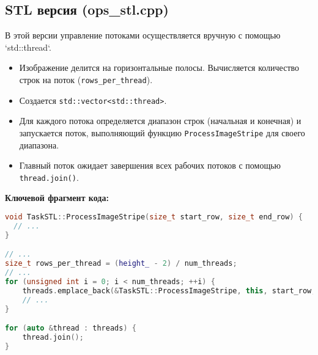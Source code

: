 \documentclass[12pt,a4paper]{extarticle}
\begin{document}
\subsection{STL версия (ops\_stl.cpp)}
В этой версии управление потоками осуществляется вручную с помощью `std::thread`.
\begin{itemize}
    \item Изображение делится на горизонтальные полосы. Вычисляется количество строк на поток (\lstinline{rows_per_thread}).
    \item Создается \lstinline{std::vector<std::thread>}.
    \item Для каждого потока определяется диапазон строк (начальная и конечная) и запускается поток, выполняющий функцию \lstinline{ProcessImageStripe} для своего диапазона.
    \item Главный поток ожидает завершения всех рабочих потоков с помощью \lstinline{thread.join()}.
\end{itemize}

\textbf{Ключевой фрагмент кода:}
\begin{lstlisting}[language=C++]
void TaskSTL::ProcessImageStripe(size_t start_row, size_t end_row) {
  // ...
}

// ...
size_t rows_per_thread = (height_ - 2) / num_threads;
// ...
for (unsigned int i = 0; i < num_threads; ++i) {
    threads.emplace_back(&TaskSTL::ProcessImageStripe, this, start_row, end_row);
    // ...
}

for (auto &thread : threads) {
    thread.join();
}
\end{lstlisting}
\end{document}
